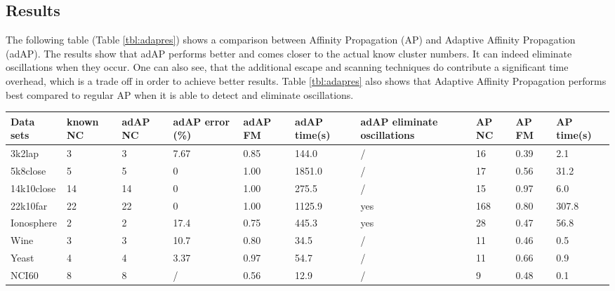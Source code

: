 \documentclass[11pt,a4paper]{article}
\begin{document}
\subsection{Results}
The following table (Table \ref{tbl:adapres}) shows a comparison between Affinity Propagation (AP) and Adaptive Affinity Propagation (adAP). The results show that adAP performs better and comes closer to the actual know cluster numbers. It can indeed eliminate oscillations when they occur. One can also see, that the additional escape and scanning techniques do contribute a significant time overhead, which is a trade off in order to achieve better results. Table \ref{tbl:adapres} also shows that Adaptive Affinity Propagation performs best compared to regular AP when it is able to detect and eliminate oscillations.
\begin{table}[h]
	\begin{center}
		\begin{tabularx}{\textwidth}{@{}XYYYYYYYYY@{}}
			\hline
			Data sets   & known NC & adAP NC & adAP error (\%) & adAP FM & adAP time(s) & adAP eliminate oscillations & AP NC & AP FM  & AP time(s) \\\hline
			3k2lap      & 3        & 3       & 7.67            & 0.85    & 144.0        & /                           & 16    & 0.39   & 2.1        \\
			5k8close    & 5        & 5       & 0               & 1.00    & 1851.0       & /                           & 17    & 0.56   & 31.2       \\
			14k10close  & 14       & 14      & 0               & 1.00    & 275.5        & /                           & 15    & 0.97   & 6.0        \\
			22k10far    & 22       & 22      & 0               & 1.00    & 1125.9       & yes                         & 168   & 0.80   & 307.8      \\
			Ionosphere  & 2        & 2       & 17.4            & 0.75    & 445.3        & yes                         & 28    & 0.47   & 56.8       \\
			Wine        & 3        & 3       & 10.7            & 0.80    & 34.5         & /                           & 11    & 0.46   & 0.5        \\
			Yeast       & 4        & 4       & 3.37            & 0.97    & 54.7         & /                           & 11    & 0.66   & 0.9        \\
			NCI60       & 8        & 8       & /               & 0.56    & 12.9         & /                           & 9     & 0.48   & 0.1        \\

\end{tabularx}
\end{center}
\end{table}
\end{document}
